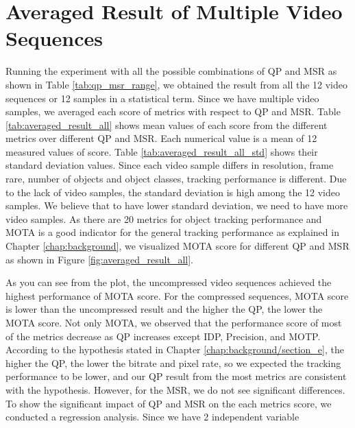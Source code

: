 \section{Averaged Result of Multiple Video Sequences}
\label{sec:results/section_a}

Running the experiment with all the possible combinations of QP and MSR as shown in Table \ref{tab:qp_msr_range}, we obtained the result from all the 12 video sequences or 12 samples in a statistical term. Since we have multiple video samples, we averaged each score of metrics with respect to QP and MSR. Table \ref{tab:averaged_result_all} shows mean values of each score from the different metrics over different QP and MSR. Each numerical value is a mean of 12 measured values of score. Table \ref{tab:averaged_result_all_std} shows their standard deviation values. Since each video sample differs in resolution, frame rare, number of objects and object classes, tracking performance is different. Due to the lack of video samples, the standard deviation is high among the 12 video samples. We believe that to have lower standard deviation, we need to have more video samples. As there are 20 metrics for object tracking performance and MOTA is a good indicator for the general tracking performance as explained in Chapter \ref{chap:background}, we visualized MOTA score for different QP and MSR as shown in Figure \ref{fig:averaged_result_all}. 



As you can see from the plot, the uncompressed video sequences achieved the highest performance of MOTA score. For the compressed sequences, MOTA score is lower than the uncompressed result and the higher the QP, the lower the MOTA score. Not only MOTA, we observed that the performance score of most of the metrics decrease as QP increases except IDP, Precision, and MOTP. According to the hypothesis stated in Chapter \ref{chap:background/section_e}, the higher the QP, the lower the bitrate and pixel rate, so we expected the tracking performance to be lower, and our QP result from the most metrics are consistent with the hypothesis. However, for the MSR, we do not see significant differences. To show the significant impact of QP and MSR on the each metrics score, we conducted a regression analysis. Since we have 2 independent variable
 